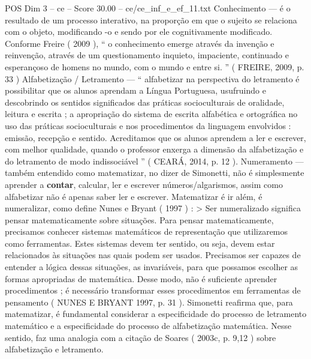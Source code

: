 \begin{textsample}{POS Dim 3 – ce – Score 30.00 – ce/ce\_inf\_e\_ef\_11.txt}
Conhecimento — é o resultado de um processo interativo, na proporção em que o sujeito se relaciona com o objeto, modificando -o e sendo por ele cognitivamente modificado.
Conforme Freire ( 2009 ), “ o conhecimento emerge através da invenção e reinvenção, através de um questionamento inquieto, impaciente, continuado e esperançoso de homens no mundo, com o mundo e entre si. ” ( FREIRE, 2009, p. 33 ) Alfabetização / Letramento — “ alfabetizar na perspectiva do letramento é possibilitar que os alunos aprendam a Língua Portuguesa, usufruindo e descobrindo os sentidos significados das práticas socioculturais de oralidade, leitura e escrita ; a apropriação do sistema de escrita alfabética e ortográfica no uso das práticas socioculturais e nos procedimentos da linguagem envolvidos : emissão, recepção e sentido.
Acreditamos que os alunos aprendem a ler e escrever, com melhor qualidade, quando o professor enxerga a dimensão da alfabetização e do letramento de modo indissociável ” ( CEARÁ, 2014, p. 12 ).
Numeramento — também entendido como matematizar, no dizer de Simonetti, não é simplesmente aprender a \textbf{contar}, calcular, ler e escrever números/algarismos, assim como alfabetizar não é apenas saber ler e escrever.
Matematizar é ir além, é numeralizar, como define Nunes e Bryant ( 1997 ) : > Ser numeralizado significa pensar matematicamente sobre situações.
Para pensar matematicamente, precisamos conhecer sistemas matemáticos de representação que utilizaremos como ferramentas.
Estes sistemas devem ter sentido, ou seja, devem estar relacionados às situações nas quais podem ser usados.
Precisamos ser capazes de entender a lógica dessas situações, as invariáveis, para que possamos escolher as formas apropriadas de matemática.
Desse modo, não é suficiente aprender procedimentos ; é necessário transformar esses procedimentos em ferramentas de pensamento ( NUNES E BRYANT 1997, p. 31 ).
Simonetti reafirma que, para matematizar, é fundamental considerar a especificidade do processo de letramento matemático e a especificidade do processo de alfabetização matemática.
Nesse sentido, faz uma analogia com a citação de Soares ( 2003c, p. 9,12 ) sobre alfabetização e letramento.

\end{textsample}
